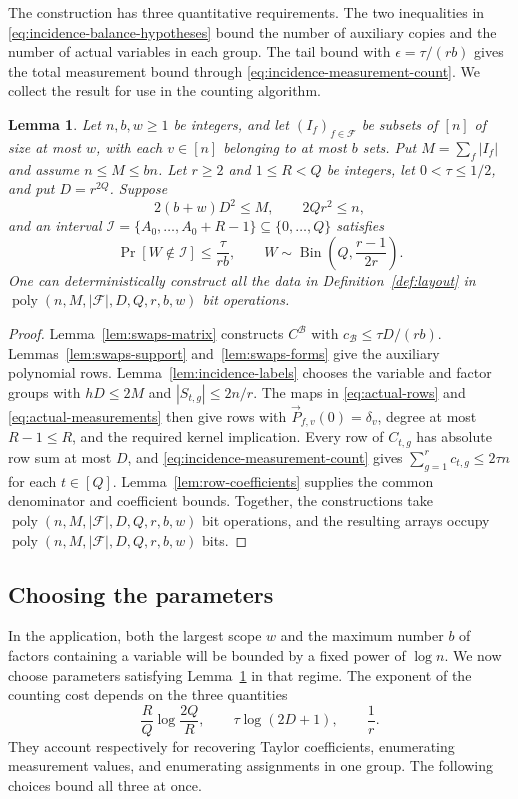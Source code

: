 \documentclass[11pt,reqno]{amsart}
\numberwithin{equation}{section}
\newtheorem{lemma}[theorem]{Lemma}
\theoremstyle{definition}\newtheorem{definition}[theorem]{Definition}
\theoremstyle{remark}\newtheorem{remark}[theorem]{Remark}
\newcommand{\poly}{\operatorname{poly}}
\renewcommand{\le}{\leqslant}
\renewcommand{\ge}{\geqslant}
\begin{document}
The construction has three quantitative requirements. The two
inequalities in \eqref{eq:incidence-balance-hypotheses} bound the number
of auxiliary copies and the number of actual variables in each group.
The tail bound with $\epsilon=\tau/(rb)$ gives the total measurement
bound through \eqref{eq:incidence-measurement-count}. We collect the
result for use in the counting algorithm.

\begin{lemma}\label{lem:layout}
Let $n,b,w\ge1$ be integers, and let $(I_f)_{f\in\mathcal F}$ be
subsets of $[n]$ of size at most $w$,
with each $v\in[n]$ belonging to at most $b$ sets. Put
$M=\sum_f|I_f|$ and assume $n\le M\le bn$. Let $r\ge2$ and
$1\le R<Q$ be integers, let $0<\tau\le1/2$, and put $D=r^{2Q}$.
Suppose
\[
 2(b+w)D^2\le M,\qquad 2Qr^2\le n,
\]
and an interval
$\mathcal I=\{A_0,\ldots,A_0+R-1\}\subseteq\{0,\ldots,Q\}$ satisfies
\[
 \Pr[W\notin\mathcal I]\le\frac{\tau}{rb},\qquad
 W\sim\operatorname{Bin}\!\left(Q,\frac{r-1}{2r}\right).
\]
One can deterministically construct all the data in
Definition~\ref{def:layout} in
$\poly(n,M,|\mathcal F|,D,Q,r,b,w)$ bit operations.
\end{lemma}
\begin{proof}
Lemma~\ref{lem:swaps-matrix} constructs $C^{\mathcal B}$ with
$c_{\mathcal B}\le\tau D/(rb)$. Lemmas~\ref{lem:swaps-support}
and~\ref{lem:swaps-forms} give the auxiliary polynomial rows.
Lemma~\ref{lem:incidence-labels} chooses the variable and factor
groups with $hD\le2M$ and $|S_{t,g}|\le2n/r$.
The maps in \eqref{eq:actual-rows} and \eqref{eq:actual-measurements}
then give rows with $\vec{P}_{f,v}(0)=\delta_v$, degree at most $R-1\le R$,
and the required kernel implication. Every row of $C_{t,g}$ has
absolute row sum at most $D$, and \eqref{eq:incidence-measurement-count}
gives $\sum_{g=1}^r c_{t,g}\le2\tau n$ for each $t\in[Q]$.
Lemma~\ref{lem:row-coefficients} supplies the common denominator and
coefficient bounds. Together, the constructions take
$\poly(n,M,|\mathcal F|,D,Q,r,b,w)$ bit operations, and the resulting
arrays occupy $\poly(n,M,|\mathcal F|,D,Q,r,b,w)$ bits.
\end{proof}

\subsection{Choosing the parameters}\label{subsec:incidence-parameters}
In the application, both the largest scope $w$ and the maximum number
$b$ of factors containing a variable will be bounded by a fixed power
of $\log n$. We now choose parameters satisfying
Lemma~\ref{lem:layout} in that regime. The exponent of the counting
cost depends on the three quantities
\[
 \frac RQ\log\frac{2Q}{R},\qquad
 \tau\log(2D+1),\qquad \frac1r.
\]
They account respectively for recovering Taylor coefficients,
enumerating measurement values, and enumerating assignments in one
group. The following choices bound all three at once.
\end{document}
